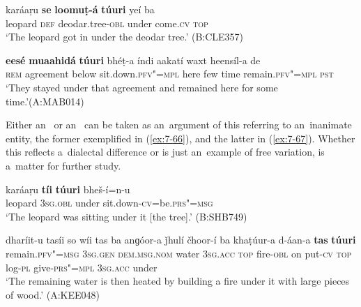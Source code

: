 \begin{exe}
\ex
\label{ex:7-65}
\gll karáaṛu \textbf{se} \textbf{loomuṭ-á} \textbf{túuri} yeí ba \\
leopard \textsc{def} deodar.tree-\textsc{obl} under come.\textsc{cv} \textsc{top} \\
\glt `The leopard got in under the deodar tree.' (B:CLE357)

\ex
\label{ex:7-65b}
\gll \textbf{eesé} \textbf{muaahidá} \textbf{ túuri} bhéṭ-a índi aakatí waxt heensíl-a de\\
\textsc{rem} agreement below sit.down.\textsc{pfv"=mpl} here few time remain.\textsc{pfv"=mpl} \textsc{pst}\\
\glt `They stayed under that agreement and remained here for some time.'\newline (A:MAB014)
\end{exe}

Either an~ or an~  can be taken as an~argument of this  referring to an~inanimate entity, the former exemplified in (\ref{ex:7-66}), and the latter in (\ref{ex:7-67}). Whether this reflects a~dialectal difference or is just an~example of free variation, is a~matter for further study.

\begin{exe}
\ex
\label{ex:7-66}
\gll karáaṛu \textbf{tíi} \textbf{túuri} bheš-í=n-u \\
leopard \textsc{3sg.obl} under sit.down-\textsc{cv}=be.\textsc{prs"=msg } \\
\glt `The leopard was sitting under it [the tree].' (B:SHB749)
\end{exe}
\begin{exe}
\ex
\label{ex:7-67}
\gll dharíit-u tasíi so wíi tas ba anɡóor-a ǰhulí čhoor-í ba khaṭúur-a d-áan-a \textbf{tas} \textbf{túuri}\\
remain.\textsc{pfv"=msg} \textsc{3sg.gen} \textsc{dem.msg.nom} water \textsc{3sg.acc} \textsc{top} fire-\textsc{obl} on put-\textsc{cv} \textsc{top} log-\textsc{pl} give-\textsc{prs"=mpl } \textsc{3sg.acc} under\\
\glt `The remaining water is then heated by building a fire under it with large pieces of wood.' (A:KEE048)
\end{exe}

